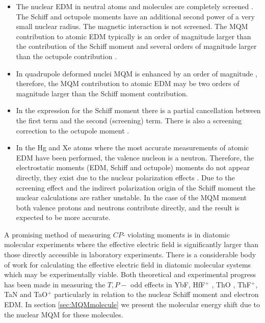 \documentclass[8pt,a4paper, twoside]{report}
\begin{document}
\begin{itemize}
\item The nuclear EDM  in neutral atoms and molecules are completely screened \cite{Schiff1963}. The Schiff and octupole moments have an additional second power of a very small nuclear radius. The magnetic interaction is not screened. The MQM contribution to atomic EDM typically is an order of magnitude larger than the contribution of the Schiff moment and several orders of magnitude larger than the octupole contribution \cite{SFK1984, Flambaum1997}.  

\item In quadrupole deformed nuclei MQM is enhanced by an order of magnitude \cite{Flambaum1994}, therefore, the MQM contribution to atomic EDM may be two orders of magnitude larger than the Schiff moment contribution.

\item In the expression for the Schiff moment there is a partial cancellation between the first term and the second (screening) term. There is also a screening correction to the octupole moment \cite{ Flambaum1986, SFK1984, Flambaum2012}.

\item In the Hg and Xe atoms  where the most accurate measurements of atomic EDM have been performed, the valence nucleon is a neutron. Therefore, the electrostatic moments (EDM, Schiff and octupole) moments do not appear directly, they exist due to the nuclear polarization effects \cite{Flambaum1986}. Due to the screening effect and the indirect polarization origin of the Schiff moment the nuclear calculations are rather unstable.
In the case of the MQM moment both valence protons and neutrons  contribute directly, and the result is expected to be more accurate\cite{Flambaum2014}.  

\end{itemize}
 A promising method of measuring $CP$- violating moments is in diatomic molecular experiments where the effective electric field is significantly larger than those directly accessible in laboratory experiments.  There is a considerable body of work for calculating the effective electric field in diatomic molecular systems which may be experimentally viable. Both theoretical and experimental progress has been made in measuring the $T,P-$ odd effects in  YbF\cite{Hudson2011, Mosyagin1998, Quiney1998, Parpia1998, Kozlov1994, Nayak2009, Steimle2007, Abe2014}, HfF$^+$ \cite{Cossel2012, Loh2013, Petrov2007, Fleig2013, Meyer2006, Skripnikov2008Hf, Le2013, Skripnikov2017Hf, Cairncross2017}, ThO \cite{Petrov2014, Meyer2008, Skripnikov2013ThO, Skripnikov2014ThO, Titov2015ThO, Fleig2014, Denis2016, Baron2017}, ThF$^+$\cite{Loh2013, Skripnikov2015Th, Denis2015}, TaN \cite{Skripnikov2015Ta, Fleig2016TaN} and TaO$^+$ \cite{Fleig2018} particularly in relation to the nuclear Schiff moment and electron EDM.   In section \ref{sec:MQMmolecule} we present the molecular energy shift due to the nuclear MQM for these molecules.\\
\end{document}
